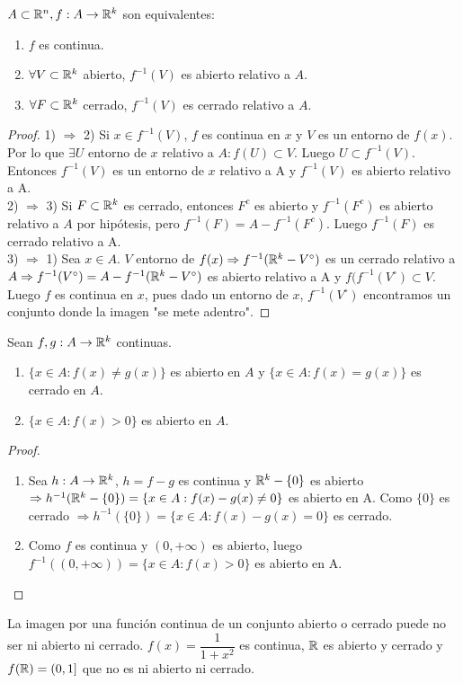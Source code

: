 \begin{prop}
  $A \subset \mathbb{R}^n, f: A \to \mathbb{R}^k$ son equivalentes:
  \begin{enumerate}
    \item $f$ es continua.
    \item $\forall V \subset \mathbb{R}^k$ abierto, $f^{-1}(V)$ es abierto relativo a $A$.
    \item $\forall F \subset \mathbb{R}^k$ cerrado, $f^{-1}(V)$ es cerrado relativo a $A$.
  \end{enumerate}
  \begin{proof}
    1) $\Rightarrow$ 2)  Si $x \in f^{-1}(V)$, $f$ es continua en $x$ y $V$ es un entorno de $f(x)$. Por lo que $\exists U$ entorno de $x$ relativo a $A : f(U) \subset V$. Luego $U \subset f^{-1}(V)$. Entonces $f^{-1}(V)$ es un entorno de $x$ relativo a A y $f^{-1}(V)$ es abierto relativo a A. \\
    2) $\Rightarrow$ 3) Si $F \subset \mathbb{R}^k$ es cerrado, entonces $F^c$ es abierto y $f^{-1}(F^c)$ es abierto relativo a $A$ por hipótesis, pero $f^{-1}(F) = A - f^{-1}(F^c)$. Luego $f^{-1}(F)$ es cerrado relativo a A. \\
    3) $\Rightarrow$ 1) Sea $x \in A$. $V$ entorno de $f(x) \Rightarrow f^{-1}(\mathbb{R}^k - V^{\circ})$ es un cerrado relativo a $A \Rightarrow f^{-1}(V^{\circ}) = A - f^{-1}(\mathbb{R}^k - V^{\circ})$ es abierto relativo a A y $f(f^{-1}(V^{\circ}) \subset V$. Luego $f$ es continua en $x$, pues dado un entorno de $x$, $f^{-1}(V^{\circ})$ encontramos un conjunto donde la imagen "se mete adentro".
  \end{proof}
\end{prop}

\clearpage

\begin{corollary}
  Sean $f, g: A \to \mathbb{R}^k$ continuas.
  \begin{enumerate}
    \item $\{ x \in A : f(x) \neq g(x) \}$ es abierto en $A$ y $\{x \in A: f(x) = g(x)\}$ es cerrado en $A$.
    \item $\{x \in A : f(x) > 0\}$ es abierto en $A$.
  \end{enumerate}
  \begin{proof}
    \begin{enumerate}
      \item Sea $h: A \to \mathbb{R}^k$, $h = f - g$ es continua y $\mathbb{R}^k - \{0\}$ es abierto $\Rightarrow h^{-1}(\mathbb{R}^k - \{0\}) = \{ x \in A : f(x) - g(x) \neq 0 \}$ es abierto en A. Como $\{0\}$ es cerrado $\Rightarrow h^{-1}(\{0\}) = \{ x \in A : f(x) - g(x) = 0\}$ es cerrado.
      \item Como $f$ es continua y $(0, +\infty)$ es abierto, luego $f^{-1}((0, +\infty)) = \{x \in A : f(x) > 0\}$ es abierto en A.
    \end{enumerate}
  \end{proof}
\end{corollary}

\begin{note}
  La imagen por una función continua de un conjunto abierto o cerrado puede no ser ni abierto ni cerrado. $f(x) = \dfrac{1}{1+x^2}$ es continua, $\mathbb{R}$ es abierto y cerrado y $f(\mathbb{R}) = (0, 1]$ que no es ni abierto ni cerrado.
\end{note}
